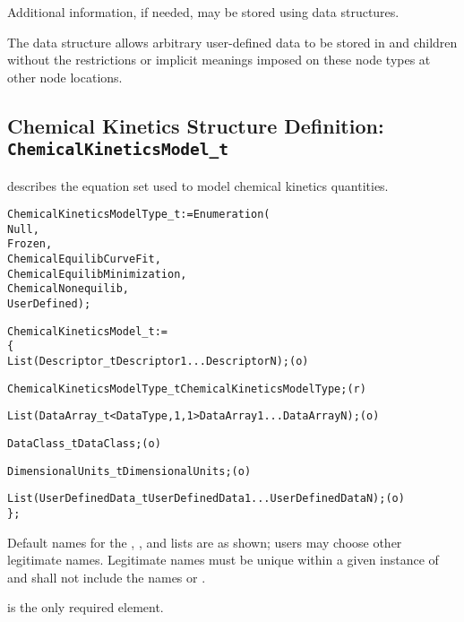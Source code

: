 Additional information, if needed, may be stored using
 data structures.

The  data structure allows arbitrary
user-defined data to be stored in  and
 children without the restrictions or implicit
meanings imposed on these node types at other node locations.

\subsection{Chemical Kinetics Structure Definition: \texttt{ChemicalKineticsModel\_t}}
\label{s:ChemicalKineticsModel}

 describes the equation set used to model
chemical kinetics quantities.
\begin{alltt}
  ChemicalKineticsModelType\_t := Enumeration(
    Null,
    Frozen,
    ChemicalEquilibCurveFit,
    ChemicalEquilibMinimization,
    ChemicalNonequilib,
    UserDefined ) ;
\end{alltt}

\begin{alltt}
  ChemicalKineticsModel\_t :=
    \{
    List( Descriptor\_t Descriptor1 ... DescriptorN ) ;                      (o)

    ChemicalKineticsModelType\_t ChemicalKineticsModelType ;                 (r)
    
    List( DataArray\_t<DataType, 1, 1> DataArray1 ... DataArrayN ) ;         (o)

    DataClass\_t DataClass ;                                                 (o)
                
    DimensionalUnits\_t DimensionalUnits ;                                   (o)

    List( UserDefinedData\_t UserDefinedData1 ... UserDefinedDataN ) ;       (o)
    \} ;
\end{alltt}

\begin{notes}
\item
 Default names for the , , and
 lists are as shown; users may choose other legitimate names.
 Legitimate names must be unique within a given instance of
  and shall not include the names
  or .
\item
  is the only required element.
\end{notes}

